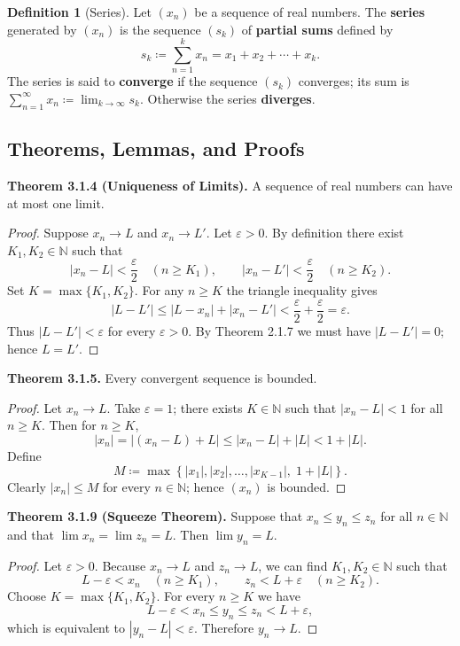 \documentclass[12pt,a4paper]{article}
\theoremstyle{definition}
\newtheorem*{definition}{Definition}
\newcommand{\N}{\mathbb{N}}
\newcommand{\eps}{\varepsilon}
\newcommand{\abs}[1]{\left\lvert#1\right\rvert}
\newcommand{\set}[1]{\left\{#1\right\}}
\begin{document}
\begin{definition}[Series]
Let \((x_n)\) be a sequence of real numbers. The \textbf{series} generated by \((x_n)\) is the sequence \((s_k)\) of \textbf{partial sums} defined by
\[
s_k \coloneqq \sum_{n=1}^{k} x_n = x_1 + x_2 + \cdots + x_k.
\]
The series is said to \textbf{converge} if the sequence \((s_k)\) converges; its sum is \(\sum_{n=1}^{\infty} x_n \coloneqq \lim_{k\to\infty} s_k\). Otherwise the series \textbf{diverges}.
\end{definition}

\subsection{Theorems, Lemmas, and Proofs}

\textbf{Theorem 3.1.4 (Uniqueness of Limits).} A sequence of real numbers can have at most one limit.

\begin{proof}
Suppose \(x_n\to L\) and \(x_n\to L'\). Let \(\eps>0\). By definition there exist \(K_1,K_2\in\N\) such that
\[
\abs{x_n-L}<\frac{\eps}{2}\quad (n\ge K_1),\qquad 
\abs{x_n-L'}<\frac{\eps}{2}\quad (n\ge K_2).
\]
Set \(K=\max\{K_1,K_2\}\). For any \(n\ge K\) the triangle inequality gives
\[
\abs{L-L'} \le \abs{L-x_n}+\abs{x_n-L'} < \frac{\eps}{2}+\frac{\eps}{2}= \eps.
\]
Thus \(\abs{L-L'}<\eps\) for every \(\eps>0\). By Theorem 2.1.7 we must have \(\abs{L-L'}=0\); hence \(L=L'\).
\end{proof}

\textbf{Theorem 3.1.5.} Every convergent sequence is bounded.

\begin{proof}
Let \(x_n\to L\). Take \(\eps=1\); there exists \(K\in\N\) such that \(\abs{x_n-L}<1\) for all \(n\ge K\). Then for \(n\ge K\),
\[
\abs{x_n} = \abs{(x_n-L)+L} \le \abs{x_n-L}+\abs{L} < 1+\abs{L}.
\]
Define
\[
M \coloneqq \max\set{\abs{x_1},\abs{x_2},\dots,\abs{x_{K-1}},\; 1+\abs{L}}.
\]
Clearly \(\abs{x_n}\le M\) for every \(n\in\N\); hence \((x_n)\) is bounded.
\end{proof}

\textbf{Theorem 3.1.9 (Squeeze Theorem).} Suppose that \(x_n\le y_n\le z_n\) for all \(n\in\N\) and that \(\lim x_n = \lim z_n = L\). Then \(\lim y_n = L\).

\begin{proof}
Let \(\eps>0\). Because \(x_n\to L\) and \(z_n\to L\), we can find \(K_1,K_2\in\N\) such that
\[
L-\eps < x_n \quad (n\ge K_1),\qquad z_n < L+\eps \quad (n\ge K_2).
\]
Choose \(K=\max\{K_1,K_2\}\). For every \(n\ge K\) we have
\[
L-\eps < x_n \le y_n \le z_n < L+\eps,
\]
which is equivalent to \(\abs{y_n-L}<\eps\). Therefore \(y_n\to L\).
\end{proof}
\end{document}

